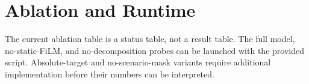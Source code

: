 \section{Ablation and Runtime}
\label{sec:ablation}

\GeneratedRuntimeInterpretation

\GeneratedRuntimeTables

\GeneratedRuntimeFigures

The current ablation table is a status table, not a result table. The full model, no-static-FiLM, and no-decomposition probes can be launched with the provided script. Absolute-target and no-scenario-mask variants require additional implementation before their numbers can be interpreted.
